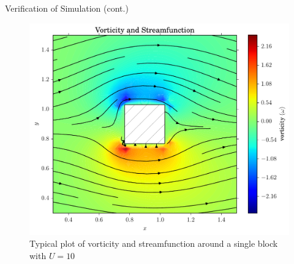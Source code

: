 \documentclass[pdf]{beamer}
\begin{document}
\begin{frame}{Verification of Simulation (cont.)}
\begin{figure}[h]
\centering
\includegraphics[width=.6\textwidth]{figs/vorticity_single.pdf}
\caption{Typical plot of vorticity and streamfunction around a single block with $U=10$}
\end{figure}
\end{frame}
\end{document}
